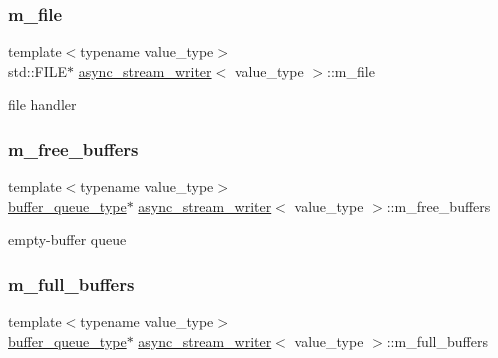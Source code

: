 \subsubsection{\texorpdfstring{m\+\_\+file}{m\_file}}
{\footnotesize\ttfamily template$<$typename value\+\_\+type$>$ \\
std\+::\+F\+I\+LE$\ast$ \hyperlink{classasync__stream__writer}{async\+\_\+stream\+\_\+writer}$<$ value\+\_\+type $>$\+::m\+\_\+file\hspace{0.3cm}{\ttfamily [private]}}



file handler 

\mbox{\label{classasync__stream__writer_ad451ef8f2eb1c884b38cd10f387ac325}} 
\subsubsection{\texorpdfstring{m\+\_\+free\+\_\+buffers}{m\_free\_buffers}}
{\footnotesize\ttfamily template$<$typename value\+\_\+type$>$ \\
\hyperlink{classasync__stream__writer_a44dba276c5208314653dd887010e7161}{buffer\+\_\+queue\+\_\+type}$\ast$ \hyperlink{classasync__stream__writer}{async\+\_\+stream\+\_\+writer}$<$ value\+\_\+type $>$\+::m\+\_\+free\+\_\+buffers\hspace{0.3cm}{\ttfamily [private]}}



empty-\/buffer queue 

\mbox{\label{classasync__stream__writer_a091edd8f3eab9d64c3bc3396d4fb7994}} 
\subsubsection{\texorpdfstring{m\+\_\+full\+\_\+buffers}{m\_full\_buffers}}
{\footnotesize\ttfamily template$<$typename value\+\_\+type$>$ \\
\hyperlink{classasync__stream__writer_a44dba276c5208314653dd887010e7161}{buffer\+\_\+queue\+\_\+type}$\ast$ \hyperlink{classasync__stream__writer}{async\+\_\+stream\+\_\+writer}$<$ value\+\_\+type $>$\+::m\+\_\+full\+\_\+buffers\hspace{0.3cm}{\ttfamily [private]}}




